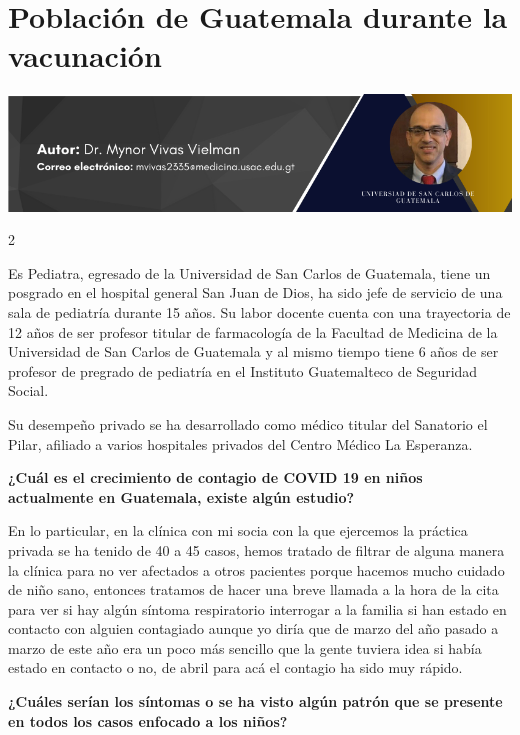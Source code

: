\documentclass[12pt,spanish,Letterpaper,openany]{book}
\begin{document}
\hypertarget{vivas}{%
\chapter{Población de Guatemala durante la vacunación}\label{vivas}}

\begin{center}\includegraphics[width=1\linewidth]{images/Vivas} \end{center}

\begin {multicols}{2}

Es Pediatra, egresado de la Universidad de San Carlos de Guatemala, tiene un posgrado en
el hospital general San Juan de Dios, ha sido jefe de servicio de una sala de pediatría durante
15 años. Su labor docente cuenta con una trayectoria de 12 años de ser profesor titular de
farmacología de la Facultad de Medicina de la Universidad de San Carlos de Guatemala y al
mismo tiempo tiene 6 años de ser profesor de pregrado de pediatría en el Instituto
Guatemalteco de Seguridad Social.

Su desempeño privado se ha desarrollado como médico titular del Sanatorio el Pilar, afiliado
a varios hospitales privados del Centro Médico La Esperanza.

\textbf{¿Cuál es el crecimiento de contagio de COVID 19 en niños actualmente en Guatemala, existe algún estudio?}

En lo particular, en la clínica con mi socia con la que ejercemos la práctica privada se ha
tenido de 40 a 45 casos, hemos tratado de filtrar de alguna manera la clínica para no ver
afectados a otros pacientes porque hacemos mucho cuidado de niño sano, entonces tratamos
de hacer una breve llamada a la hora de la cita para ver si hay algún síntoma respiratorio
interrogar a la familia si han estado en contacto con alguien contagiado aunque yo diría que
de marzo del año pasado a marzo de este año era un poco más sencillo que la gente tuviera
idea si había estado en contacto o no, de abril para acá el contagio ha sido muy rápido.

\textbf{¿Cuáles serían los síntomas o se ha visto algún patrón que se presente en todos los casos enfocado a los niños?}


\end{multicols}
\end{document}
